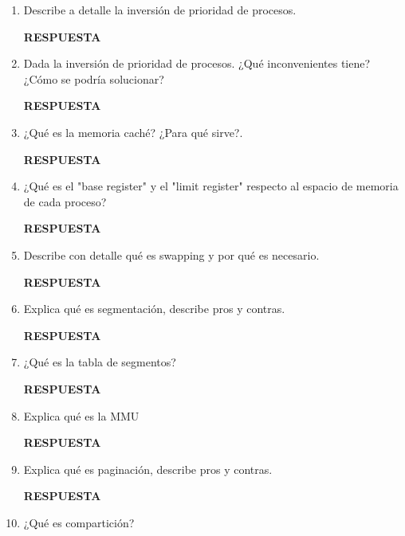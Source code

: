\documentclass[12pt]{article}
\begin{document}
\begin{enumerate}
    \item Describe a detalle la inversión de prioridad de procesos.
    \vspace{2mm}

    \textbf{RESPUESTA}

    \item Dada la inversión de prioridad de procesos. ¿Qué inconvenientes tiene? ¿Cómo se podría solucionar?
    \vspace{2mm}
    
    \textbf{RESPUESTA}
    
    \item ¿Qué es la memoria caché? ¿Para qué sirve?.
    \vspace{2mm}

    \textbf{RESPUESTA}

    \item ¿Qué es el "base register" y el "limit register" respecto al espacio de memoria de cada proceso?
    \vspace{2mm}

    \textbf{RESPUESTA}

    \item Describe con detalle qué es swapping y por qué es necesario. 
    \vspace{2mm}

    \textbf{RESPUESTA}

    \item Explica qué es segmentación, describe pros y contras.
    \vspace{2mm}

    \textbf{RESPUESTA}

    \item ¿Qué es la tabla de segmentos?  
    \vspace{2mm}

    \textbf{RESPUESTA}

    \item Explica qué es la MMU
    \vspace{2mm}

    \textbf{RESPUESTA}
    
    \item Explica qué es paginación, describe pros y contras.
    \vspace{2mm}

    \textbf{RESPUESTA}

    \item ¿Qué es compartición?
    \vspace{2mm}
    

\end{enumerate}
\end{document}
